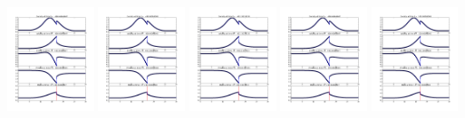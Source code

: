 \documentclass[11pt]{article}
\begin{document}
\vskip 10pt 
\includegraphics[width=0.19\textwidth]{frame0146fig1.png}
\vskip 10pt 
\includegraphics[width=0.19\textwidth]{frame0147fig1.png}
\vskip 10pt 
\includegraphics[width=0.19\textwidth]{frame0148fig1.png}
\vskip 10pt 
\includegraphics[width=0.19\textwidth]{frame0149fig1.png}
\vskip 10pt 
\includegraphics[width=0.19\textwidth]{frame0150fig1.png}
\end{document}
